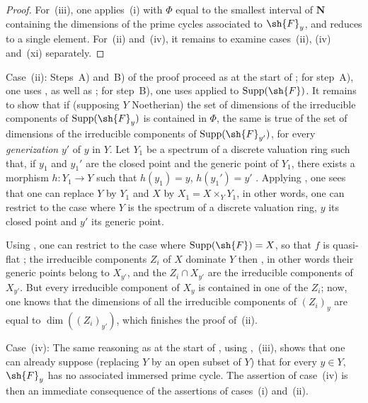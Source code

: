 \begin{proof}
For~(iii), one applies~(i) with $\Phi$ equal to the smallest interval of $\mathbf{N}$ containing the dimensions of the prime cycles associated to $\sh{F}_y$, and reduces to a single element.
For~(ii) and~(iv), it remains to examine cases~(ii), (iv) and~(xi) separately.
\end{proof}

\begin{env}[12.2.1.1]
\label{IV.12.2.1.1}
Case~(ii): Steps~A) and~B) of the proof proceed as at the start of ; for step~A), one uses ,  as well as ; for step~B), one uses  applied to $\operatorname{Supp}(\sh{F})$.
It remains to show that if (supposing $Y$ Noetherian) the set of dimensions of the irreducible components of $\operatorname{Supp}(\sh{F}_y)$ is contained in $\Phi$, the same is true of the set of dimensions of the irreducible components of $\operatorname{Supp}(\sh{F}_{y'})$, for every \emph{generization} $y'$ of $y$ in $Y$.
Let $Y_1$ be a spectrum of a discrete valuation ring such that, if $y_1$ and $y_1'$ are the closed point and the generic point of $Y_1$, there exists a morphism $h:Y_1\to Y$ such that $h(y_1)=y$, $h(y_1')=y'$ .
Applying , one sees that one can replace $Y$ by $Y_1$ and $X$ by $X_1=X\times_Y Y_1$, in other words, one can restrict to the case where $Y$ is the spectrum of a discrete valuation ring, $y$ its closed point and $y'$ its generic point.

Using , one can restrict to the case where $\operatorname{Supp}(\sh{F})=X$, so that $f$ is quasi-flat ; the irreducible components $Z_i$ of $X$ dominate $Y$ then , in other words their generic points belong to $X_{y'}$, and the $Z_i\cap X_{y'}$ are the irreducible components of $X_{y'}$.
But every irreducible component of $X_y$ is contained in one of the $Z_i$; now, one knows  that the dimensions of all the irreducible components of $(Z_i)_y$ are equal to $\dim((Z_i)_{y'})$, which finishes the proof of~(ii).
\end{env}

\begin{env}[12.2.1.2]
\label{IV.12.2.1.2}
Case~(iv): The same reasoning as at the start of , using ,~(iii), shows that one can already suppose (replacing $Y$ by an open subset of $Y$) that for every $y\in Y$, $\sh{F}_y$ has no associated immersed prime cycle.
The assertion of case~(iv) is then an immediate consequence of the assertions of cases~(i) and~(ii).
\end{env}

